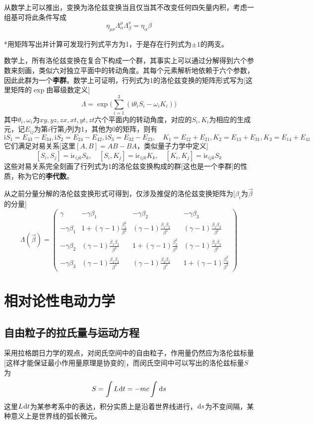 \documentclass[a4paper,UTF8,fontset=windows]{ctexart}
\newcommand*{\dr}{\hspace{0.07em}\mathrm{d}}
\newcommand*{\ir}{\mathrm{i}}
\newcommand*{\vbeta}{\vec{\beta}}
\begin{document}
从数学上可以推出，变换为洛伦兹变换当且仅当其不改变任何四矢量内积，考虑一组基可将此条件写成
$$\eta_{\mu\nu}\Lambda_\alpha^\mu\Lambda_\beta^\nu=\eta_\alpha\beta$$

*用矩阵写出并计算可发现行列式平方为1，于是存在行列式为$\pm1$的两支。

数学上，所有洛伦兹变换在复合下构成一个群，其事实上可以通过分解得到六个参数来刻画，类似六对独立平面中的转动角度。其每个元素解析地依赖于六个参数，因此此群为一个\textbf{李群}。数学上可证明，行列式为1的洛伦兹变换的矩阵形式写为[这里矩阵的$\exp$由幂级数定义]
$$\Lambda=\exp\bigg(\sum_{i=1}^3(\ir\theta_iS_i-\omega_iK_i)\bigg)$$
其中$\theta_i,\omega_i$为$xy,yz,zx,xt,yt,zt$六个平面内的转动角度，对应的$S_i,K_i$为相应的生成元，记$E_{ij}$为第$i$行第$j$列为1，其他为0的矩阵，则有
$$\ir S_1=E_{43}-E_{34},\ir S_2=E_{24}-E_{42},\ir S_3=E_{32}-E_{23},\quad K_1=E_{12}+E_{21},K_2=E_{13}+E_{31},K_3=E_{14}+E_{41}$$
它们满足对易关系[这里$[A,B]=AB-BA$，类似量子力学中定义]
$$[S_i,S_j]=\ir\epsilon_{ijk}S_k,\quad[S_i,K_j]=\ir\epsilon_{ijk}K_k,\quad[K_i,K_j]=\ir\epsilon_{ijk}S_k$$
这些对易关系完全刻画了行列式为1的洛伦兹变换构成的群[这也是一个李群]的性质，称为它的\textbf{李代数}。

从之前分量分解的洛伦兹变换形式可得到，仅涉及推促的洛伦兹变换矩阵为[$\beta_i$为$\vbeta$的分量]
$$\Lambda(\vbeta)=\begin{pmatrix}\gamma&-\gamma\beta_1&-\gamma\beta_2&-\gamma\beta_3\\-\gamma\beta_1&1+(\gamma-1)\frac{\beta_1^2}{\beta^2}&(\gamma-1)\frac{\beta_1\beta_2}{\beta^2}&(\gamma-1)\frac{\beta_1\beta_3}{\beta^2}\\-\gamma\beta_2&(\gamma-1)\frac{\beta_1\beta_2}{\beta^2}&1+(\gamma-1)\frac{\beta_2^2}{\beta^2}&(\gamma-1)\frac{\beta_2\beta_3}{\beta^2}\\-\gamma\beta_3&(\gamma-1)\frac{\beta_1\beta_3}{\beta^2}&(\gamma-1)\frac{\beta_2\beta_3}{\beta^2}&1+(\gamma-1)\frac{\beta_3^2}{\beta^2}\end{pmatrix}$$

\section{相对论性电动力学}
\subsection{自由粒子的拉氏量与运动方程}
采用拉格朗日力学的观点，对闵氏空间中的自由粒子，作用量仍然应为洛伦兹标量[这样才能保证最小作用量原理是协变的]，而闵氏空间中可以写出的洛伦兹标量$S$为
$$S=\int L\dr t=-mc\int\dr s$$
这里$L\dr t$为某参考系中的表达，积分实质上是沿着世界线进行，$\dr s$为不变间隔，某种意义上是世界线的弧长微元。
\end{document}
